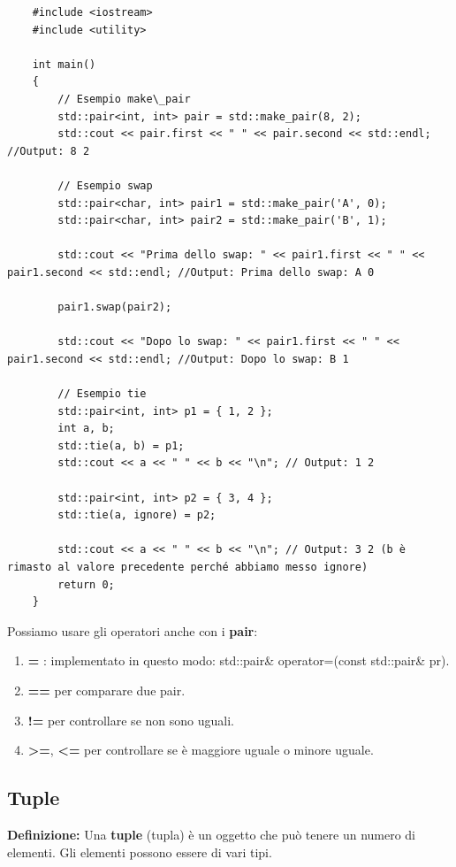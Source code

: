\begin{lstlisting}
	#include <iostream>
	#include <utility>
	
	int main()
	{
		// Esempio make\_pair
		std::pair<int, int> pair = std::make_pair(8, 2);
		std::cout << pair.first << " " << pair.second << std::endl; //Output: 8 2
		
		// Esempio swap
		std::pair<char, int> pair1 = std::make_pair('A', 0);
		std::pair<char, int> pair2 = std::make_pair('B', 1);
		
		std::cout << "Prima dello swap: " << pair1.first << " " << pair1.second << std::endl; //Output: Prima dello swap: A 0
		
		pair1.swap(pair2);
		
		std::cout << "Dopo lo swap: " << pair1.first << " " << pair1.second << std::endl; //Output: Dopo lo swap: B 1
		
		// Esempio tie
		std::pair<int, int> p1 = { 1, 2 };
		int a, b;
		std::tie(a, b) = p1;
		std::cout << a << " " << b << "\n"; // Output: 1 2
		
		std::pair<int, int> p2 = { 3, 4 };
		std::tie(a, ignore) = p2;
		
		std::cout << a << " " << b << "\n"; // Output: 3 2 (b è rimasto al valore precedente perché abbiamo messo ignore)
		return 0;
	}
\end{lstlisting}

\textsf{\small Possiamo usare gli operatori anche con i \textbf{pair}: } \\

\begin{enumerate}
	\item \textsf{\small \textbf{=} : implementato in questo modo: std::pair\& operator=(const std::pair\& pr).}
	\item \textsf{\small \textbf{==} per comparare due pair.}
	\item \textsf{\small \textbf{!=} per controllare se non sono uguali.}
	\item \textsf{\small \textbf{>=}, \textbf{<=} per controllare se è maggiore uguale o minore uguale.}
\end{enumerate}

\subsection{Tuple}

\textsf{\small \textbf{Definizione: } Una \textbf{tuple} (tupla) è un oggetto che può tenere un numero di elementi. Gli elementi possono essere di vari tipi.} \\

